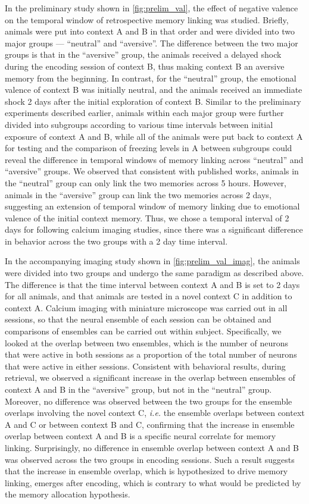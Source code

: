 \documentclass[master.tex]{subfiles}
\begin{document}
In the preliminary study shown in \autoref{fig:prelim_val}, the effect of
negative valence on the temporal window of retrospective memory linking was
studied. Briefly, animals were put into context A and B in that order and were
divided into two major groups --- ``neutral'' and ``aversive''. The difference
between the two major groups is that in the ``aversive'' group, the animals
received a delayed shock during the encoding session of context B, thus making
context B an aversive memory from the beginning. In contrast, for the
``neutral'' group, the emotional valence of context B was initially neutral, and
the animals received an immediate shock 2 days after the initial exploration of
context B. Similar to the preliminary experiments described earlier, animals
within each major group were further divided into subgroups according to
various time intervals between initial exposure of context A and B, while all of
the animals were put back to context A for testing and the comparison of
freezing levels in A between subgroups could reveal the difference in temporal
windows of memory linking across ``neutral'' and ``aversive'' groups. We
observed that consistent with published works, animals in the ``neutral'' group
can only link the two memories across 5 hours. However, animals in the
``aversive'' group can link the two memories across 2 days, suggesting an
extension of temporal window of memory linking due to emotional valence of the
initial context memory. Thus, we chose a temporal interval of 2 days for
following calcium imaging studies, since there was a significant difference in
behavior across the two groups with a 2 day time interval.

In the accompanying imaging study shown in \autoref{fig:prelim_val_imag}, the
animals were divided into two groups and undergo the same paradigm as described
above. The difference is that the time interval between context A and B is set
to 2 days for all animals, and that animals are tested in a novel context C in
addition to context A. Calcium imaging with miniature microscope was carried out
in all sessions, so that the neural ensemble of each session can be obtained and
comparisons of ensembles can be carried out within subject. Specifically, we
looked at the overlap between two ensembles, which is the number of neurons that
were active in both sessions as a proportion of the total number of neurons that
were active in either sessions. Consistent with behavioral results, during
retrieval, we observed a significant increase in the overlap between ensembles
of context A and B in the ``aversive'' group, but not in the ``neutral'' group.
Moreover, no difference was observed between the two groups for the ensemble
overlaps involving the novel context C, \textit{i.e.} the ensemble overlaps
between context A and C or between context B and C, confirming that the increase
in ensemble overlap between context A and B is a specific neural correlate for
memory linking. Surprisingly, no difference in ensemble overlap between context
A and B was observed across the two groups in encoding sessions. Such a result
suggests that the increase in ensemble overlap, which is hypothesized to drive
memory linking, emerges after encoding, which is contrary to what would be
predicted by the memory allocation hypothesis.
\end{document}
